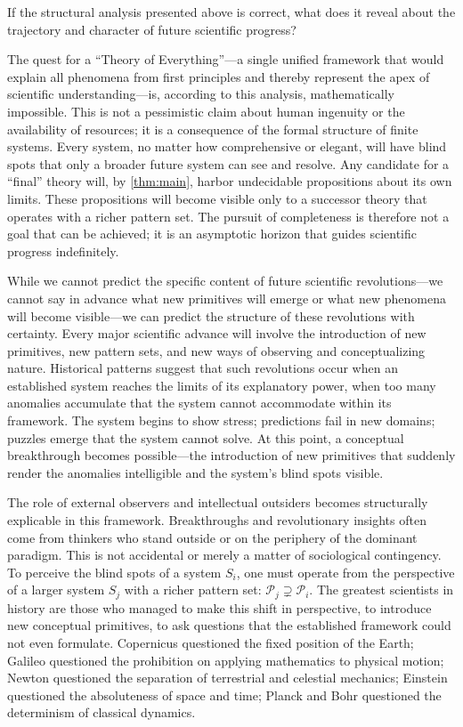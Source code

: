 \documentclass[11pt]{article}
\begin{document}
If the structural analysis presented above is correct, what does it reveal about the trajectory and character of future scientific progress?

The quest for a ``Theory of Everything''—a single unified framework that would explain all phenomena from first principles and thereby represent the apex of scientific understanding—is, according to this analysis, mathematically impossible. This is not a pessimistic claim about human ingenuity or the availability of resources; it is a consequence of the formal structure of finite systems. Every system, no matter how comprehensive or elegant, will have blind spots that only a broader future system can see and resolve. Any candidate for a ``final'' theory will, by \ref{thm:main}, harbor undecidable propositions about its own limits. These propositions will become visible only to a successor theory that operates with a richer pattern set. The pursuit of completeness is therefore not a goal that can be achieved; it is an asymptotic horizon that guides scientific progress indefinitely.

While we cannot predict the specific content of future scientific revolutions—we cannot say in advance what new primitives will emerge or what new phenomena will become visible—we can predict the structure of these revolutions with certainty. Every major scientific advance will involve the introduction of new primitives, new pattern sets, and new ways of observing and conceptualizing nature. Historical patterns suggest that such revolutions occur when an established system reaches the limits of its explanatory power, when too many anomalies accumulate that the system cannot accommodate within its framework. The system begins to show stress; predictions fail in new domains; puzzles emerge that the system cannot solve. At this point, a conceptual breakthrough becomes possible—the introduction of new primitives that suddenly render the anomalies intelligible and the system's blind spots visible.

The role of external observers and intellectual outsiders becomes structurally explicable in this framework. Breakthroughs and revolutionary insights often come from thinkers who stand outside or on the periphery of the dominant paradigm. This is not accidental or merely a matter of sociological contingency. To perceive the blind spots of a system $S_i$, one must operate from the perspective of a larger system $S_j$ with a richer pattern set: $\mathcal{P}_j \supsetneq \mathcal{P}_i$. The greatest scientists in history are those who managed to make this shift in perspective, to introduce new conceptual primitives, to ask questions that the established framework could not even formulate. Copernicus questioned the fixed position of the Earth; Galileo questioned the prohibition on applying mathematics to physical motion; Newton questioned the separation of terrestrial and celestial mechanics; Einstein questioned the absoluteness of space and time; Planck and Bohr questioned the determinism of classical dynamics.
\end{document}
